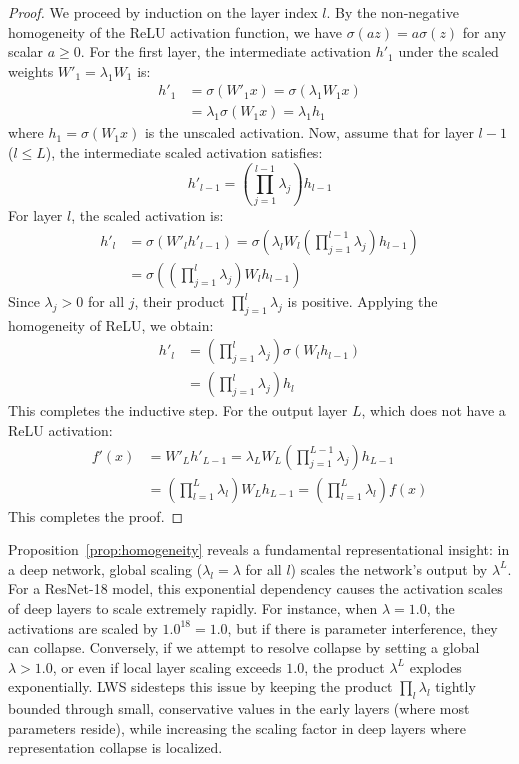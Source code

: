 \documentclass{article}
\theoremstyle{plain}
\theoremstyle{definition}
\theoremstyle{remark}
\begin{document}
\begin{proof}
We proceed by induction on the layer index $l$. By the non-negative homogeneity of the ReLU activation function, we have $\sigma(a z) = a \sigma(z)$ for any scalar $a \ge 0$. For the first layer, the intermediate activation $h'_1$ under the scaled weights $W'_1 = \lambda_1 W_1$ is:
\begin{align}
    h'_1 &= \sigma(W'_1 x) = \sigma(\lambda_1 W_1 x) \nonumber \\
    &= \lambda_1 \sigma(W_1 x) = \lambda_1 h_1
\end{align}
where $h_1 = \sigma(W_1 x)$ is the unscaled activation. Now, assume that for layer $l-1$ ($l \le L$), the intermediate scaled activation satisfies:
\begin{equation}
    h'_{l-1} = \left( \prod_{j=1}^{l-1} \lambda_j \right) h_{l-1}
\end{equation}
For layer $l$, the scaled activation is:
\begin{align}
    h'_l &= \sigma(W'_l h'_{l-1}) = \sigma\left( \lambda_l W_l \left( \prod_{j=1}^{l-1} \lambda_j \right) h_{l-1} \right) \nonumber \\
    &= \sigma\left( \left( \prod_{j=1}^{l} \lambda_j \right) W_l h_{l-1} \right)
\end{align}
Since $\lambda_j > 0$ for all $j$, their product $\prod_{j=1}^{l} \lambda_j$ is positive. Applying the homogeneity of ReLU, we obtain:
\begin{align}
    h'_l &= \left( \prod_{j=1}^{l} \lambda_j \right) \sigma(W_l h_{l-1}) \nonumber \\
    &= \left( \prod_{j=1}^{l} \lambda_j \right) h_l
\end{align}
This completes the inductive step. For the output layer $L$, which does not have a ReLU activation:
\begin{align}
    f'(x) &= W'_L h'_{L-1} = \lambda_L W_L \left( \prod_{j=1}^{L-1} \lambda_j \right) h_{L-1} \nonumber \\
    &= \left( \prod_{l=1}^{L} \lambda_l \right) W_L h_{L-1} = \left( \prod_{l=1}^{L} \lambda_l \right) f(x)
\end{align}
This completes the proof.
\end{proof}

Proposition~\ref{prop:homogeneity} reveals a fundamental representational insight: in a deep network, global scaling ($\lambda_l = \lambda$ for all $l$) scales the network's output by $\lambda^L$. For a ResNet-18 model, this exponential dependency causes the activation scales of deep layers to scale extremely rapidly. For instance, when $\lambda = 1.0$, the activations are scaled by $1.0^{18} = 1.0$, but if there is parameter interference, they can collapse. Conversely, if we attempt to resolve collapse by setting a global $\lambda > 1.0$, or even if local layer scaling exceeds $1.0$, the product $\lambda^L$ explodes exponentially. LWS sidesteps this issue by keeping the product $\prod_l \lambda_l$ tightly bounded through small, conservative values in the early layers (where most parameters reside), while increasing the scaling factor in deep layers where representation collapse is localized.
\end{document}
